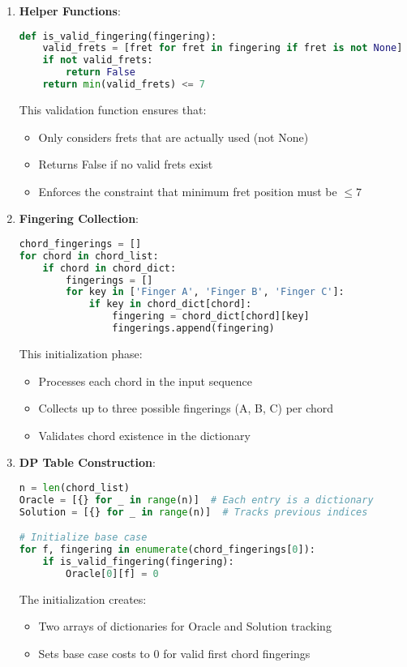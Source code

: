 \documentclass[conference]{IEEEtran}
\begin{document}
\begin{enumerate}
\item \textbf{Helper Functions}:
\begin{lstlisting}[language=Python]
def is_valid_fingering(fingering):
    valid_frets = [fret for fret in fingering if fret is not None]
    if not valid_frets:
        return False
    return min(valid_frets) <= 7
\end{lstlisting}
This validation function ensures that:
\begin{itemize}
    \item Only considers frets that are actually used (not None)
    \item Returns False if no valid frets exist
    \item Enforces the constraint that minimum fret position must be \(\leq 7\)
\end{itemize}

\item \textbf{Fingering Collection}:
\begin{lstlisting}[language=Python]
chord_fingerings = []
for chord in chord_list:
    if chord in chord_dict:
        fingerings = []
        for key in ['Finger A', 'Finger B', 'Finger C']:
            if key in chord_dict[chord]:
                fingering = chord_dict[chord][key]
                fingerings.append(fingering)
\end{lstlisting}
This initialization phase:
\begin{itemize}
    \item Processes each chord in the input sequence
    \item Collects up to three possible fingerings (A, B, C) per chord
    \item Validates chord existence in the dictionary
\end{itemize}

\item \textbf{DP Table Construction}:
\begin{lstlisting}[language=Python]
n = len(chord_list)
Oracle = [{} for _ in range(n)]  # Each entry is a dictionary
Solution = [{} for _ in range(n)]  # Tracks previous indices

# Initialize base case
for f, fingering in enumerate(chord_fingerings[0]):
    if is_valid_fingering(fingering):
        Oracle[0][f] = 0
\end{lstlisting}
The initialization creates:
\begin{itemize}
    \item Two arrays of dictionaries for Oracle and Solution tracking
    \item Sets base case costs to 0 for valid first chord fingerings
\end{itemize}


\end{enumerate}
\end{document}
